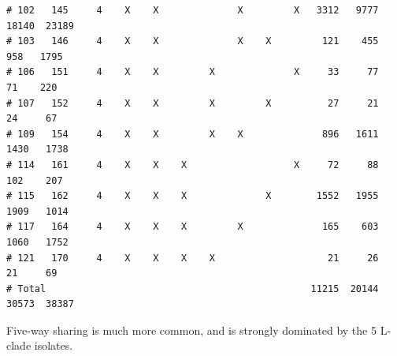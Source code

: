 \documentclass{article}\usepackage[]{graphicx}\usepackage[]{color}
\makeatletter
\newenvironment{kframe}{%
 \def\at@end@of@kframe{}%
 \ifinner\ifhmode%
  \def\at@end@of@kframe{\end{minipage}}%
  \begin{minipage}{\columnwidth}%
 \fi\fi%
 \def\FrameCommand##1{\hskip\@totalleftmargin \hskip-\fboxsep
 \colorbox{shadecolor}{##1}\hskip-\fboxsep
     \hskip-\linewidth \hskip-\@totalleftmargin \hskip\columnwidth}%
 \MakeFramed {\advance\hsize-\width
   \@totalleftmargin\z@ \linewidth\hsize
   \@setminipage}}%
 {\par\unskip\endMakeFramed%
 \at@end@of@kframe}
\newenvironment{knitrout}{}{} %
\makeatother
\begin{document}
\begin{knitrout}
\begin{kframe}
\begin{verbatim}
# 102   145     4    X    X              X         X   3312   9777  18140  23189
# 103   146     4    X    X              X    X         121    455    958   1795
# 106   151     4    X    X         X              X     33     77     71    220
# 107   152     4    X    X         X         X          27     21     24     67
# 109   154     4    X    X         X    X              896   1611   1430   1738
# 114   161     4    X    X    X                   X     72     88    102    207
# 115   162     4    X    X    X              X        1552   1955   1909   1014
# 117   164     4    X    X    X         X              165    603   1060   1752
# 121   170     4    X    X    X    X                    21     26     21     69
# Total                                               11215  20144  30573  38387
\end{verbatim}
\end{kframe}
\end{knitrout}

Five-way sharing is much more common, and is strongly dominated by the 5 L-clade isolates.
\end{document}
